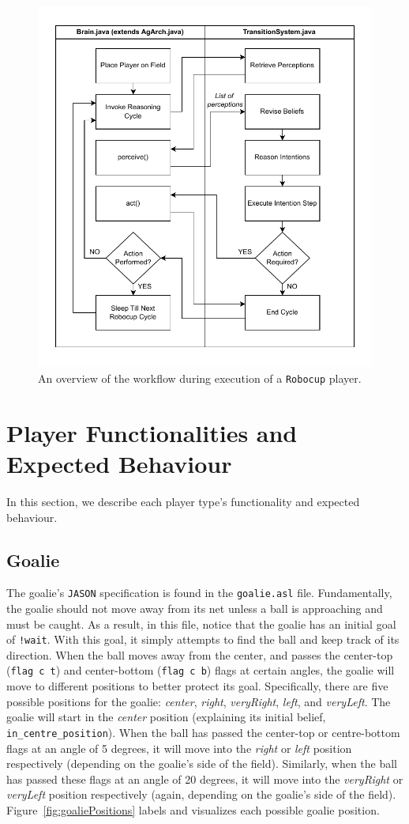 \documentclass[conference]{IEEEtran}
\begin{document}
   

\begin{figure}[ht!]
    \centering\centerline{\includegraphics[width=.35\textwidth]{Figures/ExecutionWorkflow.pdf}}
    \caption{An overview of the workflow during execution of a \texttt{Robocup} player.}
    \label{fig:robocupExecution}
\end{figure}
 





\section{Player Functionalities and Expected Behaviour}
In this section, we describe each player type's functionality and expected behaviour. 

\subsection{Goalie}\label{AA}
The goalie's \texttt{JASON} specification is found in the \texttt{goalie.asl} file. Fundamentally, the goalie should not move away from its net unless a ball is approaching and must be caught. As a result, in this file, notice that the goalie has an initial goal of \texttt{!wait}. With this goal, it simply attempts to find the ball and keep track of its direction. When the ball moves away from the center, and passes the center-top (\texttt{flag c t}) and center-bottom (\texttt{flag c b}) flags at certain angles, the goalie will move to different positions to better protect its goal. Specifically, there are five possible positions for the goalie: \textit{center}, \textit{right}, \textit{veryRight}, \textit{left}, and \textit{veryLeft}. The goalie will start in the \textit{center} position (explaining its initial belief, \texttt{in\_centre\_position}). When the ball has passed the center-top or centre-bottom flags at an angle of 5 degrees, it will move into the \textit{right} or \textit{left} position respectively (depending on the goalie's side of the field). Similarly, when the ball has passed these flags at an angle of 20 degrees,   it will move into the \textit{veryRight} or \textit{veryLeft} position respectively (again, depending on the goalie's side of the field). Figure~\ref{fig:goaliePositions} labels and visualizes each possible goalie position. 
\end{document}
